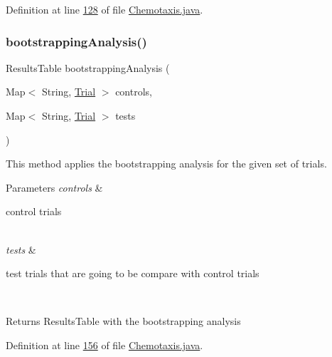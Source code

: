 Definition at line \hyperlink{_chemotaxis_8java_source_l00128}{128} of file \hyperlink{_chemotaxis_8java_source}{Chemotaxis.\+java}.

\hypertarget{classanalysis_1_1_chemotaxis_a381aa5dd2dd75a72b6b21f7b2475d888}{}\label{classanalysis_1_1_chemotaxis_a381aa5dd2dd75a72b6b21f7b2475d888} 
\subsubsection{\texorpdfstring{bootstrapping\+Analysis()}{bootstrappingAnalysis()}}
{\footnotesize\ttfamily Results\+Table bootstrapping\+Analysis (\begin{DoxyParamCaption}\item[{Map$<$ String, \hyperlink{classdata_1_1_trial}{Trial} $>$}]{controls,  }\item[{Map$<$ String, \hyperlink{classdata_1_1_trial}{Trial} $>$}]{tests }\end{DoxyParamCaption})\hspace{0.3cm}{\ttfamily [private]}}

This method applies the bootstrapping analysis for the given set of trials.


\begin{DoxyParams}{Parameters}
{\em controls} & 
\begin{DoxyItemize}
\item control trials 
\end{DoxyItemize}\\
\hline
{\em tests} & 
\begin{DoxyItemize}
\item test trials that are going to be compare with control trials 
\end{DoxyItemize}\\
\hline
\end{DoxyParams}
\begin{DoxyReturn}{Returns}
Results\+Table with the bootstrapping analysis 
\end{DoxyReturn}


Definition at line \hyperlink{_chemotaxis_8java_source_l00156}{156} of file \hyperlink{_chemotaxis_8java_source}{Chemotaxis.\+java}.

\hypertarget{classanalysis_1_1_chemotaxis_a4ab493d2d901c65e8387095a69cbf83d}{}\label{classanalysis_1_1_chemotaxis_a4ab493d2d901c65e8387095a69cbf83d} 
